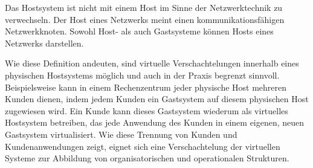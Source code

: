 \documentclass[../main.tex]{subfiles}
\begin{document}



		Das Hostsystem ist nicht mit einem Host im Sinne der Netzwerktechnik zu verwechseln. Der Host eines Netzwerks meint einen kommunikationsfähigen Netzwerkknoten. Sowohl Host- als auch Gastsysteme können Hosts eines Netzwerks darstellen.





		Wie diese Definition andeuten, sind virtuelle Verschachtelungen innerhalb eines physischen Hostsystems möglich und auch in der Praxis begrenzt sinnvoll. Beispielsweise kann in einem Rechenzentrum jeder physische Host mehreren Kunden dienen, indem jedem Kunden ein Gastsystem auf diesem physischen Host zugewiesen wird. Ein Kunde kann dieses Gastsystem wiederum als virtuelles Hostsystem betreiben, das jede Anwendung des Kunden in einem eigenen, neuen Gastsystem virtualisiert. Wie diese Trennung von Kunden und Kundenanwendungen zeigt, eignet sich eine Verschachtelung der virtuellen Systeme zur Abbildung von organisatorischen und operationalen Strukturen.
\end{document}
